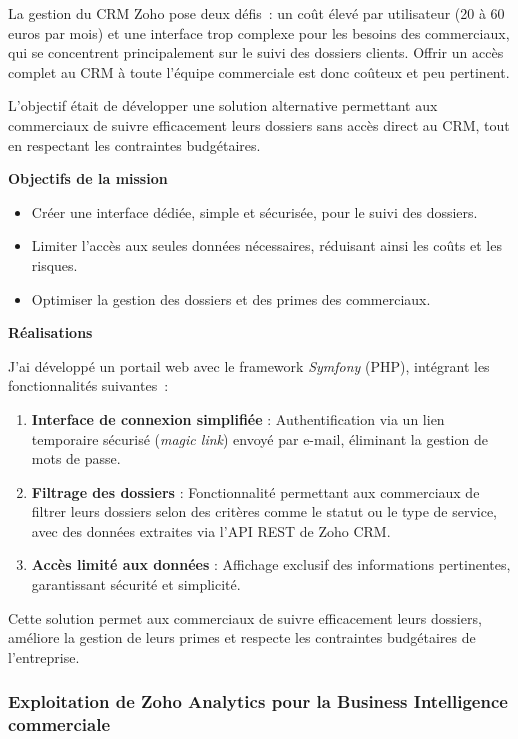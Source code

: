 La gestion du CRM Zoho pose deux défis~: un coût élevé par utilisateur (20 à 60 euros par mois) et une interface trop complexe pour les besoins des commerciaux, qui se concentrent principalement sur le suivi des dossiers clients. Offrir un accès complet au CRM à toute l’équipe commerciale est donc coûteux et peu pertinent.

L’objectif était de développer une solution alternative permettant aux commerciaux de suivre efficacement leurs dossiers sans accès direct au CRM, tout en respectant les contraintes budgétaires.

\textbf{Objectifs de la mission}

\begin{itemize}
    \item Créer une interface dédiée, simple et sécurisée, pour le suivi des dossiers.
    \item Limiter l’accès aux seules données nécessaires, réduisant ainsi les coûts et les risques.
    \item Optimiser la gestion des dossiers et des primes des commerciaux.
\end{itemize}

\textbf{Réalisations}

J’ai développé un portail web avec le framework \textit{Symfony} (PHP), intégrant les fonctionnalités suivantes~:

\begin{enumerate}
    \item \textbf{Interface de connexion simplifiée} : Authentification via un lien temporaire sécurisé (\textit{magic link}) envoyé par e-mail, éliminant la gestion de mots de passe.
    \item \textbf{Filtrage des dossiers} : Fonctionnalité permettant aux commerciaux de filtrer leurs dossiers selon des critères comme le statut ou le type de service, avec des données extraites via l’API REST de Zoho CRM.
    \item \textbf{Accès limité aux données} : Affichage exclusif des informations pertinentes, garantissant sécurité et simplicité.
\end{enumerate}

Cette solution permet aux commerciaux de suivre efficacement leurs dossiers, améliore la gestion de leurs primes et respecte les contraintes budgétaires de l’entreprise.


\subsubsection{Exploitation de Zoho Analytics pour la Business Intelligence commerciale}

